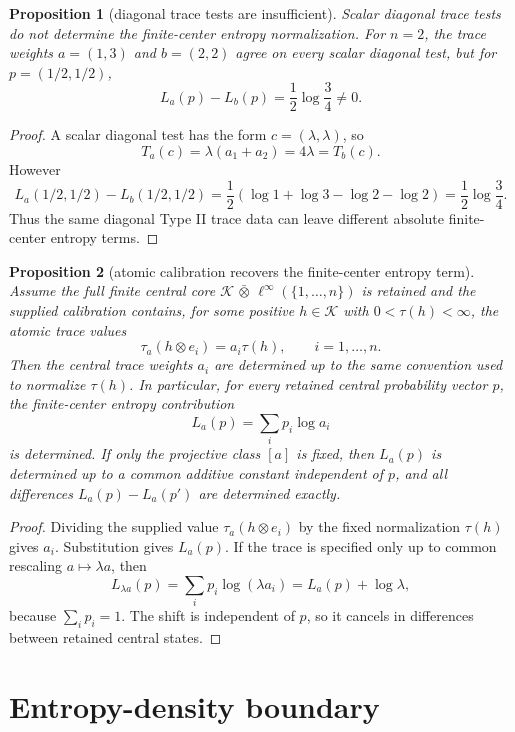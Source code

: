 \documentclass[12pt]{article}
\newtheorem{proposition}{Proposition}
\theoremstyle{remark}
\newcommand{\K}{\mathcal K}
\begin{document}
\begin{proposition}[diagonal trace tests are insufficient]
\label{prop:diagonal-insufficient}
Scalar diagonal trace tests do not determine the finite-center entropy
normalization.  For \(n=2\), the trace weights \(a=(1,3)\) and \(b=(2,2)\)
agree on every scalar diagonal test, but for \(p=(1/2,1/2)\),
\[
  L_a(p)-L_b(p)=\frac12\log\frac34\ne0 .
\]
\end{proposition}

\begin{proof}
A scalar diagonal test has the form \(c=(\lambda,\lambda)\), so
\[
  T_a(c)=\lambda(a_1+a_2)=4\lambda=T_b(c).
\]
However
\[
  L_a(1/2,1/2)-L_b(1/2,1/2)
  =
  \frac12(\log1+\log3-\log2-\log2)
  =
  \frac12\log\frac34 .
\]
Thus the same diagonal Type II trace data can leave different absolute
finite-center entropy terms.
\end{proof}

\begin{proposition}[atomic calibration recovers the finite-center entropy term]
\label{prop:atomic-calibration}
Assume the full finite central core
\(\K\,\bar\otimes\,\ell^\infty(\{1,\ldots,n\})\) is retained and the supplied
calibration contains, for some positive \(h\in\K\) with \(0<\tau(h)<\infty\),
the atomic trace values
\[
  \tau_a(h\otimes e_i)=a_i\tau(h),\qquad i=1,\ldots,n .
\]
Then the central trace weights \(a_i\) are determined up to the same convention
used to normalize \(\tau(h)\).  In particular, for every retained central
probability vector \(p\), the finite-center entropy contribution
\[
  L_a(p)=\sum_i p_i\log a_i
\]
is determined.  If only the projective class \([a]\) is fixed, then \(L_a(p)\)
is determined up to a common additive constant independent of \(p\), and all
differences \(L_a(p)-L_a(p')\) are determined exactly.
\end{proposition}

\begin{proof}
Dividing the supplied value \(\tau_a(h\otimes e_i)\) by the fixed normalization
\(\tau(h)\) gives \(a_i\).  Substitution gives \(L_a(p)\).  If the trace is
specified only up to common rescaling \(a\mapsto\lambda a\), then
\[
  L_{\lambda a}(p)=\sum_i p_i\log(\lambda a_i)
  =L_a(p)+\log\lambda,
\]
because \(\sum_i p_i=1\).  The shift is independent of \(p\), so it cancels in
differences between retained central states.
\end{proof}

\section{Entropy-density boundary}
\end{document}
